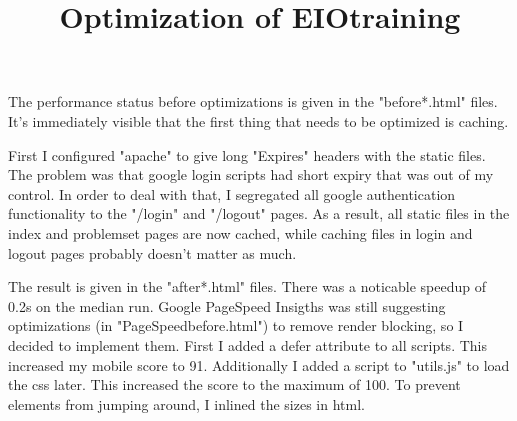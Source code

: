 \documentclass{article}
\begin{document}
\title{Optimization of EIOtraining}
\maketitle

The performance status before optimizations is given in the "before*.html" files. It's immediately visible that the first thing that needs to be optimized is caching.

First I configured "apache" to give long "Expires" headers with the static files. The problem was that google login scripts had short expiry that was out of my control. In order to deal with that, I segregated all google authentication functionality to the "/login" and "/logout" pages. As a result, all static files in the index and problemset pages are now cached, while caching files in login and logout pages probably doesn't matter as much.

The result is given in the "after*.html" files. There was a noticable speedup of 0.2s on the median run. Google PageSpeed Insigths was still suggesting optimizations (in "PageSpeedbefore.html") to remove render blocking, so I decided to implement them. First I added a defer attribute to all scripts. This increased my mobile score to 91. Additionally I added a script to "utils.js" to load the css later. This increased the score to the maximum of 100. To prevent elements from jumping around, I inlined the sizes in html.
\end{document}
